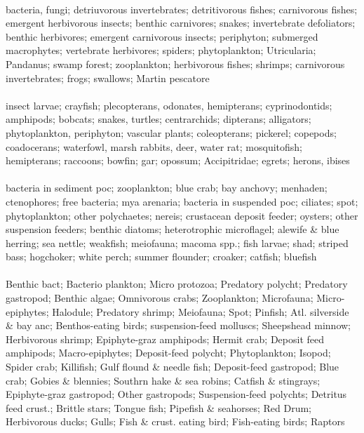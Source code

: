 \fullhline
\hline
{} \\
\hline
bacteria, fungi; detriuvorous invertebrates; detritivorous fishes; carnivorous fishes; emergent herbivorous insects; benthic carnivores; snakes; invertebrate defoliators; benthic herbivores; emergent carnivorous insects; periphyton; submerged macrophytes; vertebrate herbivores; spiders; phytoplankton; Utricularia; Pandanus; swamp forest; zooplankton; herbivorous fishes; shrimps; carnivorous invertebrates; frogs; swallows; Martin pescatore\\
\fullhline
\hline
{} \\
\hline
insect larvae; crayfish; plecopterans, odonates, hemipterans; cyprinodontids; amphipods; bobcats; snakes, turtles; centrarchids; dipterans; alligators; phytoplankton, periphyton; vascular plants; coleopterans; pickerel; copepods; coadocerans; waterfowl, marsh rabbits, deer, water rat; mosquitofish; hemipterans; raccoons; bowfin; gar; opossum; Accipitridae; egrets; herons, ibises\\
\fullhline
\hline
{} \\
\hline
bacteria in sediment poc; zooplankton; blue crab; bay anchovy; menhaden; ctenophores; free bacteria; mya arenaria; bacteria in suspended poc; ciliates; spot; phytoplankton; other polychaetes; nereis; crustacean deposit feeder; oysters; other suspension feeders; benthic diatoms; heterotrophic microflagel; alewife \& blue herring; sea nettle; weakfish; meiofauna; macoma spp.; fish larvae; shad; striped bass; hogchoker; white perch; summer flounder; croaker; catfish; bluefish\\
\fullhline
\hline
{} \\
\hline
Benthic bact; Bacterio plankton; Micro protozoa; Predatory polycht; Predatory gastropod; Benthic algae; Omnivorous crabs; Zooplankton; Microfauna; Micro-epiphytes; Halodule; Predatory shrimp; Meiofauna; Spot; Pinfish; Atl. silverside \& bay anc; Benthos-eating birds; suspension-feed molluscs; Sheepshead minnow; Herbivorous shrimp; Epiphyte-graz amphipods; Hermit crab; Deposit feed amphipods; Macro-epiphytes; Deposit-feed polycht; Phytoplankton; Isopod; Spider crab; Killifish; Gulf flound \& needle fish; Deposit-feed gastropod; Blue crab; Gobies \& blennies; Southrn hake \& sea robins; Catfish \& stingrays; Epiphyte-graz gastropod; Other gastropods; Suspension-feed polychts; Detritus feed crust.; Brittle stars; Tongue fish; Pipefish \& seahorses; Red Drum; Herbivorous ducks; Gulls; Fish \& crust. eating bird; Fish-eating birds; Raptors\\
